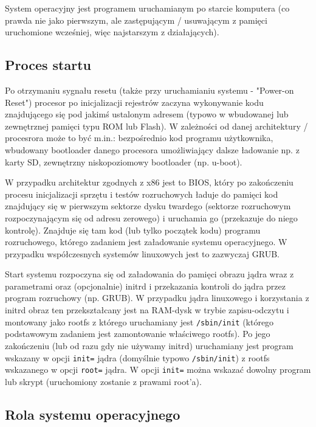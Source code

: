 \documentclass{pdfBooklets}
\begin{document}
System operacyjny jest programem uruchamianym po starcie komputera (co prawda nie jako pierwszym, ale zastępującym / usuwającym z pamięci uruchomione wcześniej, więc najstarszym z działających).

\subsection{Proces startu}

Po otrzymaniu sygnału resetu (także przy uruchamianiu systemu - "Power-on Reset") procesor po inicjalizacji rejestrów zaczyna wykonywanie kodu znajdującego się pod jakimś ustalonym adresem (typowo w wbudowanej lub zewnętrznej pamięci typu ROM lub Flash). W zależności od danej architektury / procesrora może to być m.in.: bezpośrednio kod programu użytkownika, wbudowany bootloader danego procesora umożliwiający dalsze ładowanie np. z karty SD, zewnętrzny niskopoziomowy bootloader (np. u-boot).

W przypadku architektur zgodnych z x86 jest to BIOS, który po zakończeniu procesu inicjalizacji sprzętu i testów rozruchowych ładuje do pamięci kod znajdujący się w pierwszym sektorze dysku twardego (sektorze rozruchowym rozpoczynającym się od adresu zerowego) i uruchamia go (przekazuje do niego kontrolę). Znajduje się tam kod (lub tylko początek kodu) programu rozruchowego, którego zadaniem jest załadowanie systemu operacyjnego. W przypadku współczesnych systemów linuxowych jest to zazwyczaj GRUB.

Start systemu rozpoczyna się od załadowania do pamięci obrazu jądra wraz z parametrami oraz (opcjonalnie) initrd i przekazania kontroli do jądra przez program rozruchowy (np. GRUB). W przypadku jądra linuxowego i korzystania z initrd obraz ten przekształcany jest na RAM-dysk w trybie zapisu-odczytu i montowany jako rootfs z którego uruchamiany jest \Verb#/sbin/init# (którego podstawowym zadaniem jest zamontowanie właściwego rootfs). Po jego zakończeniu (lub od razu gdy nie używamy initrd) uruchamiany jest program wskazany w opcji \Verb#init=# jądra (domyślnie typowo \Verb#/sbin/init#) z rootfs wskazanego w opcji \Verb#root=# jądra. W opcji \Verb#init=# można wskazać dowolny program lub skrypt (uruchomiony zostanie z prawami root'a).

\subsection{Rola systemu operacyjnego}
\end{document}

